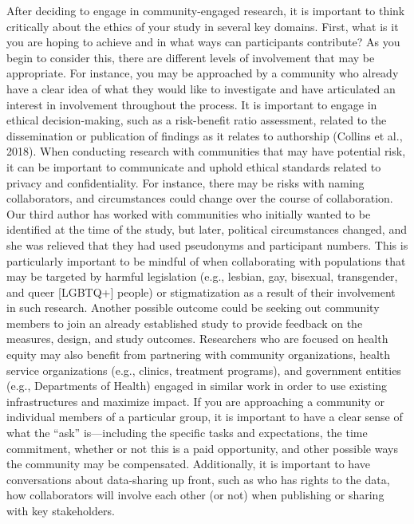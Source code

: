 \documentclass[
  11pt,
]{book}
\begin{document}
After deciding to engage in community-engaged research, it is important to think critically about the ethics of your study in several key domains. First, what is it you are hoping to achieve and in what ways can participants contribute? As you begin to consider this, there are different levels of involvement that may be appropriate. For instance, you may be approached by a community who already have a clear idea of what they would like to investigate and have articulated an interest in involvement throughout the process. It is important to engage in ethical decision-making, such as a risk-benefit ratio assessment, related to the dissemination or publication of findings as it relates to authorship (Collins et al., 2018). When conducting research with communities that may have potential risk, it can be important to communicate and uphold ethical standards related to privacy and confidentiality. For instance, there may be risks with naming collaborators, and circumstances could change over the course of collaboration. Our third author has worked with communities who initially wanted to be identified at the time of the study, but later, political circumstances changed, and she was relieved that they had used pseudonyms and participant numbers. This is particularly important to be mindful of when collaborating with populations that may be targeted by harmful legislation (e.g., lesbian, gay, bisexual, transgender, and queer {[}LGBTQ+{]} people) or stigmatization as a result of their involvement in such research. Another possible outcome could be seeking out community members to join an already established study to provide feedback on the measures, design, and study outcomes. Researchers who are focused on health equity may also benefit from partnering with community organizations, health service organizations (e.g., clinics, treatment programs), and government entities (e.g., Departments of Health) engaged in similar work in order to use existing infrastructures and maximize impact. If you are approaching a community or individual members of a particular group, it is important to have a clear sense of what the ``ask'' is---including the specific tasks and expectations, the time commitment, whether or not this is a paid opportunity, and other possible ways the community may be compensated. Additionally, it is important to have conversations about data-sharing up front, such as who has rights to the data, how collaborators will involve each other (or not) when publishing or sharing with key stakeholders.
\end{document}
